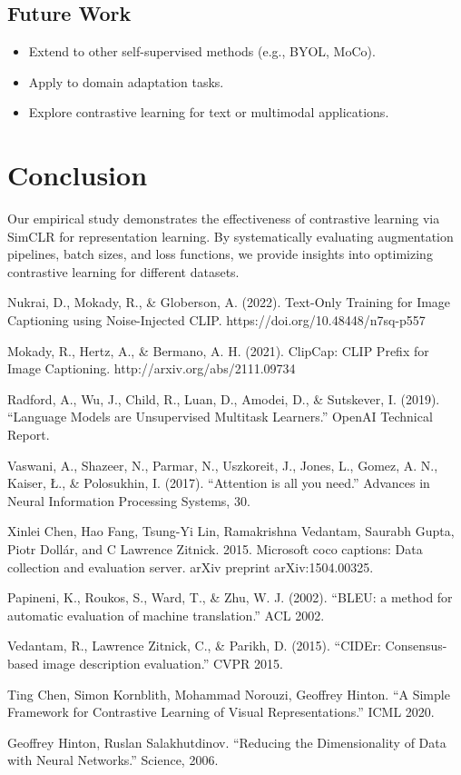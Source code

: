 \documentclass[11pt]{article}
\begin{document}
\subsection{Future Work}
\begin{itemize}
  \item Extend to other self-supervised methods (e.g., BYOL, MoCo).
  \item Apply to domain adaptation tasks.
  \item Explore contrastive learning for text or multimodal applications.
\end{itemize}

\section{Conclusion}
Our empirical study demonstrates the effectiveness of contrastive learning via SimCLR for representation
learning. By systematically evaluating augmentation pipelines, batch sizes, and loss functions, we provide
insights into optimizing contrastive learning for different datasets.
\pagebreak
\begin{thebibliography}{99}
    Nukrai, D., Mokady, R., \& Globerson, A. (2022). Text-Only Training for Image Captioning using Noise-Injected CLIP. https://doi.org/10.48448/n7sq-p557
    
    Mokady, R., Hertz, A., \& Bermano, A. H. (2021). ClipCap: CLIP Prefix for Image Captioning. http://arxiv.org/abs/2111.09734
    
    Radford, A., Wu, J., Child, R., Luan, D., Amodei, D., \& Sutskever, I. (2019). ``Language Models are Unsupervised Multitask Learners.'' OpenAI Technical Report.

    Vaswani, A., Shazeer, N., Parmar, N., Uszkoreit, J., Jones, L., Gomez, A. N., Kaiser, Ł., \& Polosukhin, I. (2017). ``Attention is all you need.'' 
    Advances in Neural Information Processing Systems, 30.

    Xinlei Chen, Hao Fang, Tsung-Yi Lin, Ramakrishna Vedantam, Saurabh Gupta, Piotr Dollár, and C Lawrence Zitnick. 2015. Microsoft coco captions: Data collection and evaluation server. arXiv preprint arXiv:1504.00325.
    
    Papineni, K., Roukos, S., Ward, T., \& Zhu, W. J. (2002). ``BLEU: a method for automatic evaluation of machine translation.'' ACL 2002.
    
    Vedantam, R., Lawrence Zitnick, C., \& Parikh, D. (2015). ``CIDEr: Consensus-based image description evaluation.'' CVPR 2015.
    
    Ting Chen, Simon Kornblith, Mohammad Norouzi, Geoffrey Hinton. ``A Simple Framework for Contrastive Learning of Visual Representations.'' ICML 2020.
    
    Geoffrey Hinton, Ruslan Salakhutdinov. ``Reducing the Dimensionality of Data with Neural Networks.'' Science, 2006.
    \end{thebibliography}
\end{document}
